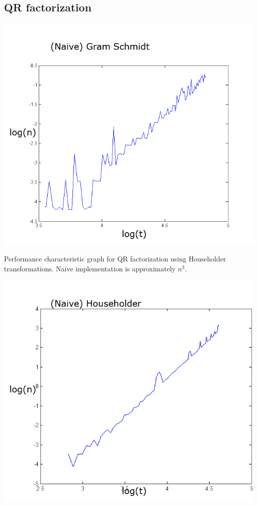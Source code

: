\documentclass[10pt,fullpage]{article}
\begin{document}
\newpage

\subsection{QR factorization}

\includegraphics[scale=0.5]{./test_results/naive_gramschmidt.png}

Performance characteristic graph for QR factorization using
Householder transformations. Naive implementation is approximately
$n^{3}$.


\newpage

\includegraphics[scale=0.5]{./test_results/naive_householder.png}
\end{document}

